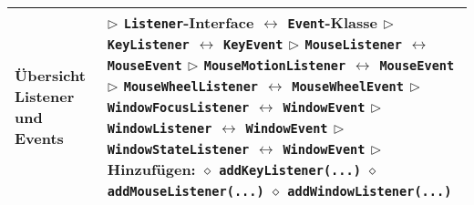 \begin{longtable}{ | p{} p{} | }
	\makecell[l]{Übersicht Listener und \\ Events} & \makecell[l]{
	$\rhd$ \texttt{Listener}-Interface $\leftrightarrow$ \texttt{Event}-Klasse \\
	$\rhd$ \texttt{KeyListener} $\leftrightarrow$ \texttt{KeyEvent} \\
	$\rhd$ \texttt{MouseListener} $\leftrightarrow$ \texttt{MouseEvent} \\
	$\rhd$ \texttt{MouseMotionListener} $\leftrightarrow$ \texttt{MouseEvent} \\
	$\rhd$ \texttt{MouseWheelListener} $\leftrightarrow$ \texttt{MouseWheelEvent} \\ 
	$\rhd$ \texttt{WindowFocusListener} $\leftrightarrow$ \texttt{WindowEvent} \\
	$\rhd$ \texttt{WindowListener} $\leftrightarrow$ \texttt{WindowEvent} \\ 
	$\rhd$ \texttt{WindowStateListener} $\leftrightarrow$ \texttt{WindowEvent} \\
	$\rhd$ Hinzufügen: \\
	\hspace{0.4cm} $\diamond$ \texttt{addKeyListener(...)} \\
	\hspace{0.4cm} $\diamond$ \texttt{addMouseListener(...)} \\
	\hspace{0.4cm} $\diamond$ \texttt{addWindowListener(...)} } \\ \hline


\end{longtable}
